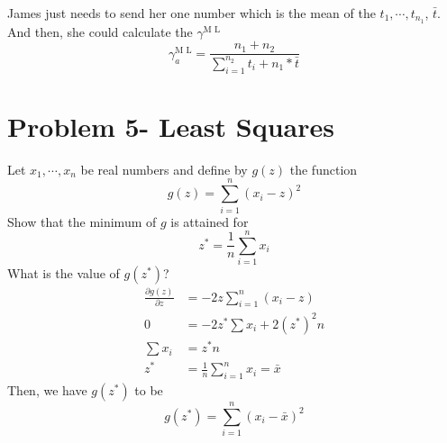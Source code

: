 \documentclass[preprint,12pt]{elsarticle}
\begin{document}
\begin{enumerate}
        James just needs to send her one number which is the mean of the
        $t_1,\cdots,t_{n_1}$, $\bar{t}$.\\ 
        And then, she could calculate the $\gamma^{\text{M L}}$
        \begin{equation*}
            \gamma_a^{\text{M L}}= \frac{n_1+n_2}{\sum_{i=1}^{n_2}t_i + n_1*\bar{t}}
        \end{equation*}
    \end{enumerate}

    \section{Problem 5- Least Squares}
    Let $x_1,\cdots, x_n$ be real numbers and define by $g(z)$ the function
    \begin{equation*}
        g(z) = \sum_{i=1}^n(x_i-z)^2
    \end{equation*}
    Show that the minimum of $g$ is attained for 
    \begin{equation*}
        z^{*} = \frac{1}{n}\sum_{i=1}^n x_i
    \end{equation*}
    What is the value of $g(z^{*})$?
    \begin{align*}
        \frac{\partial g(z)}{\partial z}    &= -2z\sum_{i=1}^n (x_i-z)\\
        0 &= -2z^{*}\sum x_i + 2(z^{*})^2n\\
        \sum x_i &= z^{*}n \\
        z^{*} &= \frac{1}{n}\sum_{i=1}^n x_i = \bar{x}
    \end{align*}
    Then, we have $g(z^{*})$ to be 
    \begin{equation*}
        g(z^{*}) = \sum_{i=1}^n (x_i - \bar{x})^2
    \end{equation*}
\end{document}
